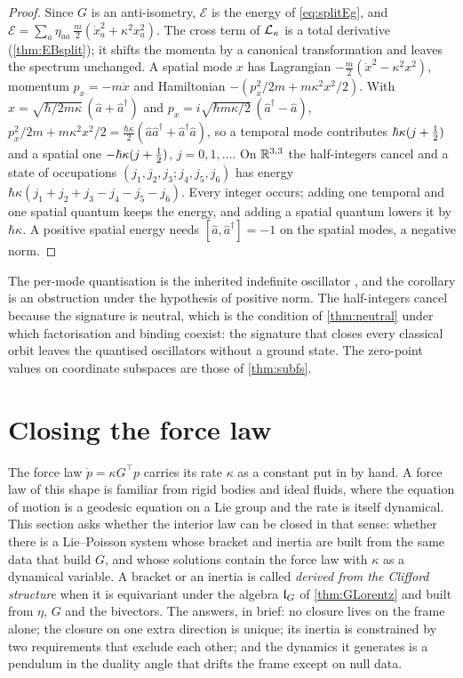 \begin{proof}
Since $G$ is an anti-isometry, $\mathcal E$ is the energy of \eqref{eq:splitEg}, and
$\mathcal E=\sum_a\eta_{aa}\,\tfrac m2(\dot x_a^2+\kappa^2x_a^2)$. The cross term of $\mathcal L_\kappa$ is a total derivative (\cref{thm:EBsplit}); it
shifts the momenta by a canonical transformation and leaves the spectrum unchanged. A spatial mode $x$ has Lagrangian
$-\tfrac m2(\dot x^2-\kappa^2x^2)$, momentum $p_x=-m\dot x$ and Hamiltonian $-(p_x^2/2m+m\kappa^2x^2/2)$. With
$x=\sqrt{\hbar/2m\kappa}\,(\hat a+\hat a^\dagger)$ and $p_x=i\sqrt{\hbar m\kappa/2}\,(\hat a^\dagger-\hat a)$,
$p_x^2/2m+m\kappa^2x^2/2=\tfrac{\hbar\kappa}2(\hat a\hat a^\dagger+\hat a^\dagger\hat a)$, so a temporal mode contributes $\hbar\kappa(j+\tfrac12)$ and a spatial one
$-\hbar\kappa(j+\tfrac12)$, $j=0,1,\dots$. On $\mathbb{R}^{3,3}$ the half-integers cancel and a state of occupations $(j_1,j_2,j_3;j_4,j_5,j_6)$ has energy
$\hbar\kappa(j_1+j_2+j_3-j_4-j_5-j_6)$. Every integer occurs; adding one temporal and one spatial quantum keeps the energy, and adding a
spatial quantum lowers it by $\hbar\kappa$. A positive spatial energy needs $[\hat a,\hat a^\dagger]=-1$ on the spatial modes, a negative norm.
\end{proof}

The per-mode quantisation is the inherited indefinite oscillator \cite{PaisUhlenbeck50}, and the corollary is an obstruction under the
hypothesis of positive norm. The half-integers cancel because the signature is neutral, which is the condition of \cref{thm:neutral}
under which factorisation and binding coexist: the signature that closes every classical orbit leaves the quantised oscillators without a
ground state. The zero-point values on coordinate subspaces are those of \cref{thm:subfs}.



\section{Closing the force law}
\label{sec:closure}

The force law $\dot p=\kappa G^{\!\top}p$ carries its rate $\kappa$ as a constant put in by hand. A force law of this shape is familiar from
rigid bodies and ideal fluids, where the equation of motion is a geodesic equation on a Lie group and the rate is itself dynamical. This
section asks whether the interior law can be closed in that sense: whether there is a Lie--Poisson system whose bracket and inertia are built
from the same data that build $G$, and whose solutions contain the force law with $\kappa$ as a dynamical variable. A bracket or an inertia is
called \emph{derived from the Clifford structure} when it is equivariant under the algebra $\mathfrak l_G$ of \cref{thm:GLorentz} and built from
$\eta$, $G$ and the bivectors. The answers, in brief: no closure lives on the frame alone; the closure on one extra direction is unique; its
inertia is constrained by two requirements that exclude each other; and the dynamics it generates is a pendulum in the duality angle that
drifts the frame except on null data.

